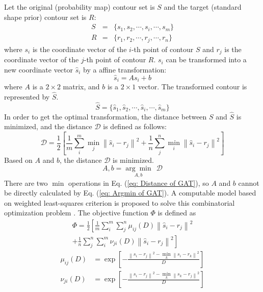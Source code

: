 Let the original (probability map) contour set is $S$ and the target (standard shape prior) contour set is $R$:
\begin{eqnarray*}
  S &=& \{s_1, s_2, \cdots, s_i, \cdots, s_m \} \\
  R &=& \{r_1, r_2, \cdots, r_j, \cdots, r_n\}
\end{eqnarray*}
where $s_i$ is the coordinate vector of the $i$-th point of contour $S$ and $r_j$ is the coordinate vector of the $j$-th point of contour $R$. $s_i$ can be transformed into a new coordinate vector $\hat{s}_i$ by a affine transformation:
\begin{equation}
    \hat{s}_i = A s_i + b
\end{equation}
where $A$ is a $2\times 2$ matrix, and $b$ is a $2\times 1$ vector. The transformed contour is represented by $\hat{S}$.
\begin{equation*}
    \hat{S} = \{\hat{s}_1, \hat{s}_2, \cdots, \hat{s}_i, \cdots, \hat{s}_m\}
\end{equation*}
In order to get the optimal transformation, the distance between $S$ and $\hat{S}$ is minimized, and the distance $\mathcal{D}$ is defined as follows:
\begin{equation}\label{eq: Distance of GAT}
\mathcal{D} = \frac{1}{2}\left[ \frac{1}{m}\sum_i^m \underset{j}{\min}\left\|\hat{s}_i - r_j\right\|^2 + \frac{1}{n}\sum_j^n \underset{i}{\min}\left\|\hat{s}_i-r_j\right\|^2 \right]
\end{equation}
Based on $A$ and $b$, the distance $\mathcal{D}$ is minimized.
\begin{equation}\label{eq: Argmin of GAT}
    A,b = \underset{A,b}{\arg\min} \ \ \mathcal{D}
\end{equation}
There are two $\min$ operations in Eq. (\ref{eq: Distance of GAT}), so $A$ and $b$ cannot be directly calculated by Eq. (\ref{eq: Argmin of GAT}). A computable model based on weighted least-squares criterion is proposed to solve this combinatorial optimization problem \cite{GAT:wakahara1998adaptive}. The objective function $\Phi$ is defined as
\begin{multline}\label{eq: new objective funtion of GAT}
    \Phi = \frac{1}{2}\left[ \frac{1}{m}\sum_i^m\sum_j^n \mu_{ij}(D)\left\|\hat{s}_i-r_j\right\|^2 \right. \\
    \left. + \frac{1}{n}\sum_j^n\sum_i^m \nu_{ji}(D)\left\|\hat{s}_i-r_j\right\|^2 \right]
\end{multline}
\begin{align*}
  \mu_{ij}(D) &= \exp\left[-\frac{\left\|s_i-r_j\right\|^2 - \underset{k}{\min}\left\| s_i-r_k \right\|^2}{D} \right] \\
  \nu_{ji}(D) &= \exp\left[-\frac{\left\|s_i-r_j\right\|^2 - \underset{k}{\min}\left\| s_k-r_j \right\|^2}{D} \right]
\end{align*}
